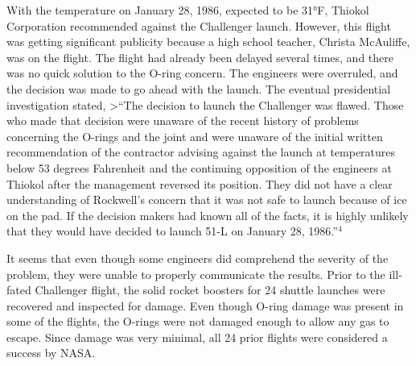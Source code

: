 \documentclass[
]{report}
\begin{document}
With the temperature on January 28, 1986, expected to be 31°F, Thiokol Corporation recommended
against the Challenger launch. However, this flight was getting significant publicity because a high school
teacher, Christa McAuliffe, was on the flight. The flight had already been delayed several times, and there
was no quick solution to the O-ring concern. The engineers were overruled, and the decision was made to go
ahead with the launch. The eventual presidential investigation stated,
\textgreater{}``The decision to launch the Challenger was flawed. Those who made that decision were unaware of
the recent history of problems concerning the O-rings and the joint and were unaware of the initial
written recommendation of the contractor advising against the launch at temperatures below 53
degrees Fahrenheit and the continuing opposition of the engineers at Thiokol after the management
reversed its position. They did not have a clear understanding of Rockwell's concern that it was not
safe to launch because of ice on the pad. If the decision makers had known all of the facts, it is highly
unlikely that they would have decided to launch 51-L on January 28, 1986.''\(^4\)

It seems that even though some engineers did comprehend the severity of the problem, they were unable
to properly communicate the results. Prior to the ill-fated Challenger flight, the solid rocket boosters for 24
shuttle launches were recovered and inspected for damage. Even though O-ring damage was present in some
of the flights, the O-rings were not damaged enough to allow any gas to escape. Since damage was very
minimal, all 24 prior flights were considered a success by NASA.
\end{document}
